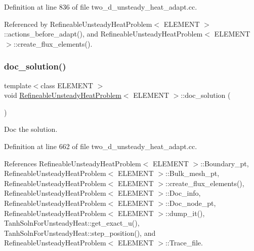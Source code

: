 Definition at line 836 of file two\+\_\+d\+\_\+unsteady\+\_\+heat\+\_\+adapt.\+cc.



Referenced by Refineable\+Unsteady\+Heat\+Problem$<$ E\+L\+E\+M\+E\+N\+T $>$\+::actions\+\_\+before\+\_\+adapt(), and Refineable\+Unsteady\+Heat\+Problem$<$ E\+L\+E\+M\+E\+N\+T $>$\+::create\+\_\+flux\+\_\+elements().

\mbox{\label{classRefineableUnsteadyHeatProblem_a77d590171785b6b5f4070af9401c0e37}} 
\subsubsection{\texorpdfstring{doc\+\_\+solution()}{doc\_solution()}}
{\footnotesize\ttfamily template$<$class E\+L\+E\+M\+E\+NT $>$ \\
void \hyperlink{classRefineableUnsteadyHeatProblem}{Refineable\+Unsteady\+Heat\+Problem}$<$ E\+L\+E\+M\+E\+NT $>$\+::doc\+\_\+solution (\begin{DoxyParamCaption}{ }\end{DoxyParamCaption})}



Doc the solution. 



Definition at line 662 of file two\+\_\+d\+\_\+unsteady\+\_\+heat\+\_\+adapt.\+cc.



References Refineable\+Unsteady\+Heat\+Problem$<$ E\+L\+E\+M\+E\+N\+T $>$\+::\+Boundary\+\_\+pt, Refineable\+Unsteady\+Heat\+Problem$<$ E\+L\+E\+M\+E\+N\+T $>$\+::\+Bulk\+\_\+mesh\+\_\+pt, Refineable\+Unsteady\+Heat\+Problem$<$ E\+L\+E\+M\+E\+N\+T $>$\+::create\+\_\+flux\+\_\+elements(), Refineable\+Unsteady\+Heat\+Problem$<$ E\+L\+E\+M\+E\+N\+T $>$\+::\+Doc\+\_\+info, Refineable\+Unsteady\+Heat\+Problem$<$ E\+L\+E\+M\+E\+N\+T $>$\+::\+Doc\+\_\+node\+\_\+pt, Refineable\+Unsteady\+Heat\+Problem$<$ E\+L\+E\+M\+E\+N\+T $>$\+::dump\+\_\+it(), Tanh\+Soln\+For\+Unsteady\+Heat\+::get\+\_\+exact\+\_\+u(), Tanh\+Soln\+For\+Unsteady\+Heat\+::step\+\_\+position(), and Refineable\+Unsteady\+Heat\+Problem$<$ E\+L\+E\+M\+E\+N\+T $>$\+::\+Trace\+\_\+file.



